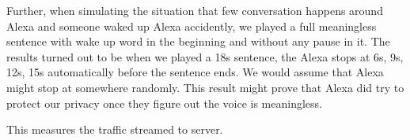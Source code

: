 Further, when simulating the situation that few conversation happens around Alexa and someone waked up Alexa accidently, we played a full meaningless sentence with wake up word in the beginning and without any pause in it. The results turned out to be when we played a 18s sentence, the Alexa stops at 6s, 9s, 12s, 15s automatically before the sentence ends. We would assume that Alexa might stop at somewhere randomly. This result might prove that Alexa did try to protect our privacy once they figure out the voice is meaningless.

This measures the traffic streamed to server.


